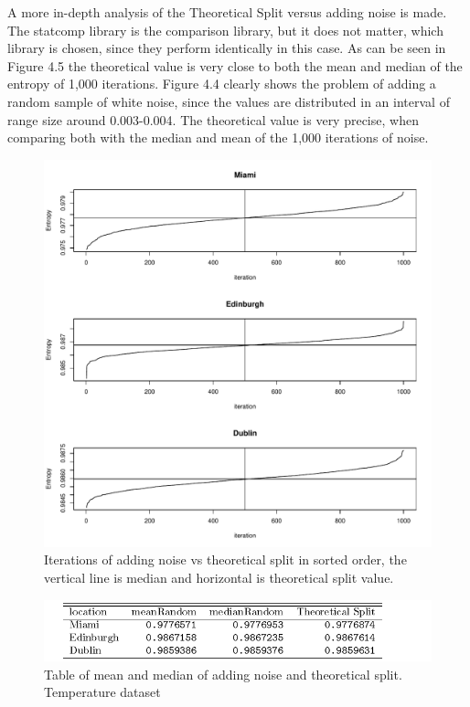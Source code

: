 A more in-depth analysis of the Theoretical Split versus adding noise is made. The statcomp library is the comparison library, but it does not matter, which library is chosen, since they perform identically in this case. As can be seen in Figure 4.5 the theoretical value is very close to both the mean and median of the entropy of 1,000 iterations. Figure 4.4 clearly shows the problem of adding a random sample of white noise, since the values are distributed in an interval of range size around 0.003-0.004. The theoretical value is very precise, when comparing both with the median and mean of the 1,000 iterations of noise.

\begin{figure}
    \centering
    \includegraphics[width=\textwidth,keepaspectratio]{./Weather/noiseStochasticTheoretical.pdf}
    \caption{Iterations of adding noise vs theoretical split in sorted order, the vertical line is median and horizontal is theoretical split value.}
\end{figure}

\begin{figure}
    \centering
    \includegraphics[width=\textwidth,keepaspectratio]{./Weather/random_vs_theoreticalSplit.pdf}
    \caption{Table of mean and median of adding noise and theoretical split. Temperature dataset}
\end{figure}

